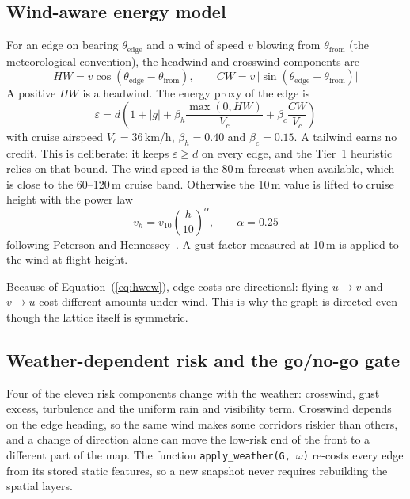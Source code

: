 \subsection{Wind-aware energy model}

For an edge on bearing $\theta_\mathrm{edge}$ and a wind of speed $v$ blowing from
$\theta_\mathrm{from}$ (the meteorological convention), the headwind and crosswind
components are
\begin{equation}
  H\!W = v\cos(\theta_\mathrm{edge} - \theta_\mathrm{from}), \qquad
  C\!W = v\,\lvert\sin(\theta_\mathrm{edge} - \theta_\mathrm{from})\rvert \label{eq:hwcw}
\end{equation}
A positive $H\!W$ is a headwind. The energy proxy of the edge is
\begin{equation}
  \varepsilon = d\left(1 + \lvert g\rvert + \beta_h\frac{\max(0, H\!W)}{V_c}
  + \beta_c\frac{C\!W}{V_c}\right) \label{eq:energy}
\end{equation}
with cruise airspeed $V_c = 36$\,km/h, $\beta_h = 0.40$ and $\beta_c = 0.15$. A
tailwind earns no credit. This is deliberate: it keeps $\varepsilon \geq d$ on every
edge, and the Tier~1 heuristic relies on that bound. The wind speed is the 80\,m
forecast when available, which is close to the 60--120\,m cruise band. Otherwise the
10\,m value is lifted to cruise height with the power law
\begin{equation}
  v_h = v_{10}\left(\frac{h}{10}\right)^{\alpha}, \qquad \alpha = 0.25
\end{equation}
following Peterson and Hennessey~\cite{r19}. A gust factor measured at 10\,m is applied
to the wind at flight height.

Because of Equation~(\ref{eq:hwcw}), edge costs are directional: flying $u \rightarrow
v$ and $v \rightarrow u$ cost different amounts under wind. This is why the graph is
directed even though the lattice itself is symmetric.

\subsection{Weather-dependent risk and the go/no-go gate}

Four of the eleven risk components change with the weather: crosswind, gust excess,
turbulence and the uniform rain and visibility term. Crosswind depends on the edge
heading, so the same wind makes some corridors riskier than others, and a change of
direction alone can move the low-risk end of the front to a different part of the map.
The function \texttt{apply\_weather(G, $\omega$)} re-costs every edge from its stored
static features, so a new snapshot never requires rebuilding the spatial layers.

